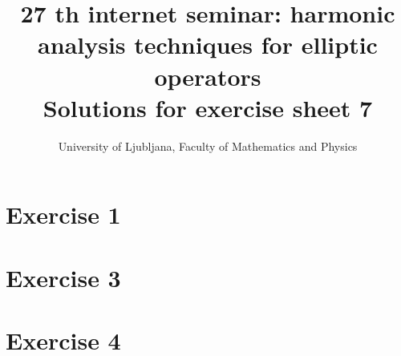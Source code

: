 \documentclass[a4paper,11pt]{article}
\begin{document}
\title{27 th internet seminar: harmonic analysis techniques for elliptic operators \\ 
Solutions for exercise sheet 7}
\author{University of Ljubljana, Faculty of Mathematics and Physics}
\date{}

\maketitle


\section*{Exercise 1}

\section*{Exercise 3}

\section*{Exercise 4}
\end{document}
